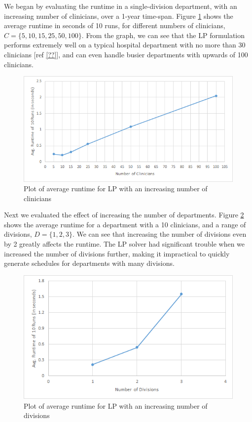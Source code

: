 We began by evaluating the runtime in a single-division department, with an increasing number of clinicians, over a 1-year time-span. Figure \ref{fig:avg-runtime-clinicians} shows the average runtime in seconds of 10 runs, for different numbers of clinicians, $C = \{5, 10, 15, 25, 50, 100\}$. From the graph, we can see that the LP formulation performs extremely well on a typical hospital department with no more than 30 clinicians [ref \ref{??}], and can even handle busier departments with upwards of 100 clinicians. \\

\begin{figure}[h]
	\centering
	\includegraphics[scale=.6]{fig/avg_runtime_clinicians}
	\caption{Plot of average runtime for LP with an increasing number of clinicians}
	\label{fig:avg-runtime-clinicians}
\end{figure}

Next we evaluated the effect of increasing the number of departments. Figure \ref{fig:avg-runtime-divisions} shows the average runtime for a department with a 10 clinicians, and a range of divisions, $D = \{1, 2, 3\}$. We can see that increasing the number of divisions even by 2 greatly affects the runtime. The LP solver had significant trouble when we increased the number of divisions further, making it impractical to quickly generate schedules for departments with many divisions. \\

\begin{figure}[h]
	\centering
	\includegraphics[scale=.6]{fig/avg_runtime_divisions}
	\caption{Plot of average runtime for LP with an increasing number of divisions}
	\label{fig:avg-runtime-divisions}
\end{figure}

